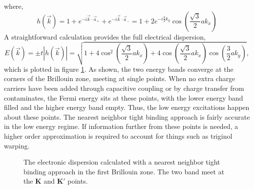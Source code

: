 where,
\begin{equation}
	h(\vec{k})=1+e^{-i \vec{k} \cdot \vec{a}_+}+e^{-i \vec{k} \cdot \vec{a}_-}
		=1+2 e^{-i \frac{3}{2} k_y}\cos \left(\frac{\sqrt{3}}{2} a k_x \right)
	\label{eq:TB:hk}
\end{equation}
A straightforward calculation provides the full electrical dispersion,
\begin{equation*}
	E(\vec{k})=\pm t |h(\vec{k})|=\sqrt{1+4 \cos^2 \left(\frac{\sqrt{3}}{2} a k_x\right)
		+4 \cos\left(\frac{\sqrt{3}}{2} a k_x \right) \cos \left(\frac{3}{2} a k_y\right)},
\end{equation*}
which is plotted in figure \ref{fig:TB:Dispersion}.
As shown, the two energy bands converge at the corners of the Brillouin zone, meeting at single points.
When no extra charge carriers have been added through capacitive coupling or by charge transfer from contaminates, the Fermi energy sits at these points, with the lower energy band filled and the higher energy band empty. %
Thus, the low energy excitations happen about these points.
The nearest neighbor tight binding approach is fairly accurate in the low energy regime.
If information further from these points is needed, a higher order approximation is required to account for things such as triginol warping.

\begin{figure}
	\begin{center}
	
	\end{center}
	\caption{\label{fig:TB:Dispersion} The electronic dispersion calculated with a nearest neighbor tight binding approach in the first Brillouin zone.  The two band meet at the $\bm{K}$ and $\bm{K'}$ points.}	
\end{figure}

